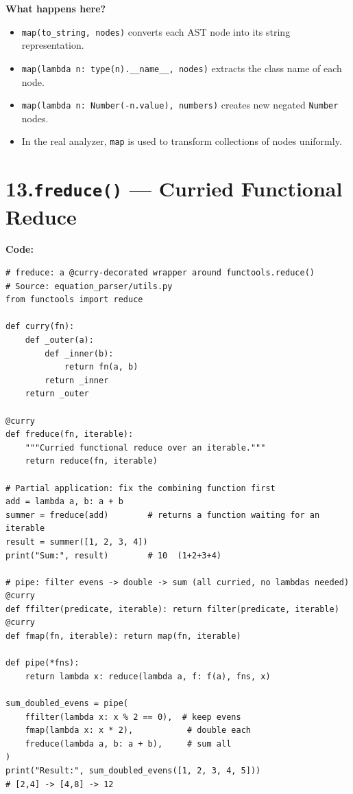 \documentclass[12pt, a4paper]{article}
\begin{document}
\textbf{What happens here?}
\begin{itemize}
    \item \texttt{map(to\_string, nodes)} converts each AST node into its string representation.
    \item \texttt{map(lambda n: type(n).\_\_name\_\_, nodes)} extracts the class name of each node.
    \item \texttt{map(lambda n: Number(-n.value), numbers)} creates new negated \texttt{Number} nodes.
    \item In the real analyzer, \texttt{map} is used to transform collections of nodes uniformly.
\end{itemize}

\newpage
\section{13.\quad \texttt{freduce()} --- Curried Functional Reduce}

\textbf{Code:}

\begin{lstlisting}
# freduce: a @curry-decorated wrapper around functools.reduce()
# Source: equation_parser/utils.py
from functools import reduce

def curry(fn):
    def _outer(a):
        def _inner(b):
            return fn(a, b)
        return _inner
    return _outer

@curry
def freduce(fn, iterable):
    """Curried functional reduce over an iterable."""
    return reduce(fn, iterable)

# Partial application: fix the combining function first
add = lambda a, b: a + b
summer = freduce(add)        # returns a function waiting for an iterable
result = summer([1, 2, 3, 4])
print("Sum:", result)        # 10  (1+2+3+4)

# pipe: filter evens -> double -> sum (all curried, no lambdas needed)
@curry
def ffilter(predicate, iterable): return filter(predicate, iterable)
@curry
def fmap(fn, iterable): return map(fn, iterable)

def pipe(*fns):
    return lambda x: reduce(lambda a, f: f(a), fns, x)

sum_doubled_evens = pipe(
    ffilter(lambda x: x % 2 == 0),  # keep evens
    fmap(lambda x: x * 2),           # double each
    freduce(lambda a, b: a + b),     # sum all
)
print("Result:", sum_doubled_evens([1, 2, 3, 4, 5]))
# [2,4] -> [4,8] -> 12
\end{lstlisting}
\end{document}
